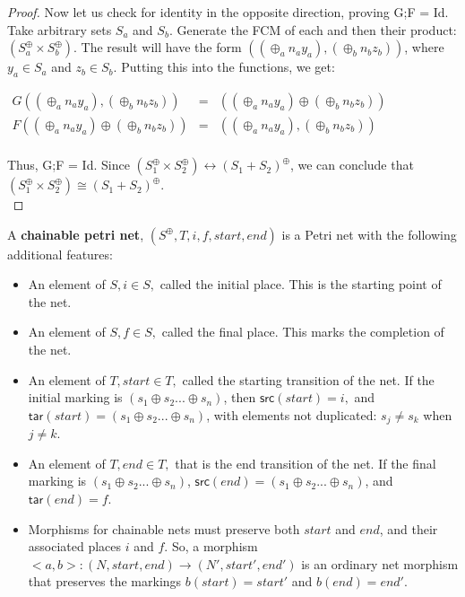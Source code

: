 \begin{lemma}
\begin{proof}
Now let us check for identity in the opposite direction, proving G;F = Id.\\
Take arbitrary sets $S_a$ and $S_b$. Generate the FCM of each and then their product: $(S_a^\oplus \times S_b^\oplus)$. The result will have the form $((\oplus_a n_a y_a), (\oplus_b n_b z_b))$, where $y_a \in S_a$ and $z_b \in S_b$. Putting this into the functions, we get:\\
\begin{center}
  \begin{math}
    \begin{array}{lll}
     G((\oplus_a n_a y_a), (\oplus_b n_b z_b)) & = & ((\oplus_a n_a y_a) \oplus (\oplus_b n_b z_b)) \\
     F((\oplus_a n_a y_a) \oplus (\oplus_b n_b z_b)) & = & ((\oplus_a n_a y_a), (\oplus_b n_b z_b))\\
    \end{array}
  \end{math}
\end{center}
 
Thus, G;F = Id. 
Since $(S_1 ^\oplus \times S_2 ^\oplus) \leftrightarrow (S_1 + S_2)^\oplus$, we can conclude that $(S_1 ^\oplus \times S_2 ^\oplus) \cong (S_1 + S_2)^\oplus$.\\
\end{proof}
%
\end{lemma}
%
\begin{definition}
  \label{Chainable-Petri-Net}
  A \textbf{chainable petri net}, $(S^\oplus, T, i, f, start, end)$ is a Petri net with the following additional features: 
  \begin{itemize}
  \item An element of $S, i \in S,$ called the initial place. This is the starting point of the net.
  \item An element of $S, f \in S,$ called the final place. This marks the completion of the net.
  \item An element of $T, start \in T,$ called the starting transition of the net. If the initial marking is $(s_1 \oplus s_2 ... \oplus s_n)$, then $\mathsf{src}(start) = i,$ and $\mathsf{tar}(start) = (s_1 \oplus s_2 ... \oplus s_n)$, with elements not duplicated: $s_j \neq s_k$ when $j \neq k$. %
  \item An element of $T, end \in T,$ that is the end transition of the net. If the final marking is $(s_1 \oplus s_2 ... \oplus s_n)$, $\mathsf{src}(end) = (s_1 \oplus s_2 ... \oplus s_n)$, and $\mathsf{tar}(end) = f$. 
   \item Morphisms for chainable nets must preserve both $start$ and $end$, and their associated places $i$ and $f$. So, a morphism $<a,b>: (N, start, end) \to (N', start', end')$ is an ordinary net morphism that preserves the markings $b(start) = start'$ and $b(end) = end'$. 
 \end{itemize}
\end{definition}
